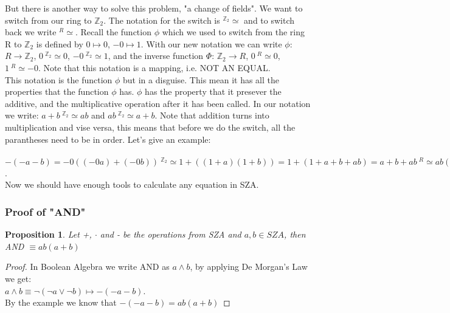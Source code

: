 \documentclass[12pt]{report}
\newtheorem{proposition}{Proposition}[section]
\theoremstyle{definition}
\theoremstyle{remark}
\begin{document}
      But there is another way to solve this problem, "a change of fields". We want to switch from our ring to $\mathbb{Z}_2$. The notation for the switch is $^{\mathbb{Z}_2}\simeq$ and to switch back we write $^R\simeq$. Recall the function $\phi$ which we used to switch from the ring R to $\mathbb{Z}_2$ is defined by $0\mapsto 0$, $-0\mapsto 1$. With our new notation we can write $\phi$: $R\rightarrow \mathbb{Z}_2$, $0\ ^{\mathbb{Z}_2}\simeq 0$, $-0\ ^{\mathbb{Z}_2}\simeq 1$, and the inverse function $\Phi$: $\mathbb{Z}_2 \rightarrow R$, $0\ ^R\simeq 0$, $1\ ^R\simeq -0$. Note that this notation is a mapping, i.e. NOT AN EQUAL.\\

      This notation is the function $\phi$ but in a disguise. This mean it has all the properties that the function $\phi$ has. $\phi$ has the property that it presever the additive, and the multiplicative operation after it has been called. In our notation we write: $a+b\ ^{\mathbb{Z}_2}\simeq ab$ and $ab\ ^{\mathbb{Z}_2}\simeq a+b$. Note that addition turns into multiplication and vise versa, this means that before we do the switch, all the parantheses need to be in order. Let's give an example:\\\\

      $-(-a-b)=-0((-0a)+(-0b))\ ^{\mathbb{Z}_2}\simeq 1+((1+a)(1+b))=1 +(1+a+b+ab)=a+b+ab \ ^R\simeq ab(a+b)$.\\

      Now we should have enough tools to calculate any equation in SZA.

      \subsubsection{Proof of "AND"}
        \begin{proposition}
          Let +, $\cdot $ and - be the operations from SZA and $a,b\in SZA$, then\\ AND $\equiv ab(a+b)$
        \end{proposition}
        \begin{proof}
          In Boolean Algebra we write AND as $a\wedge b$, by applying De Morgan's Law we get:\\
          $a\wedge b\equiv \neg (\neg a\vee \neg b) \mapsto -(-a-b)$.\\
          By the example we know that $-(-a-b)=ab(a+b)$
        \end{proof}

\newpage
\end{document}
